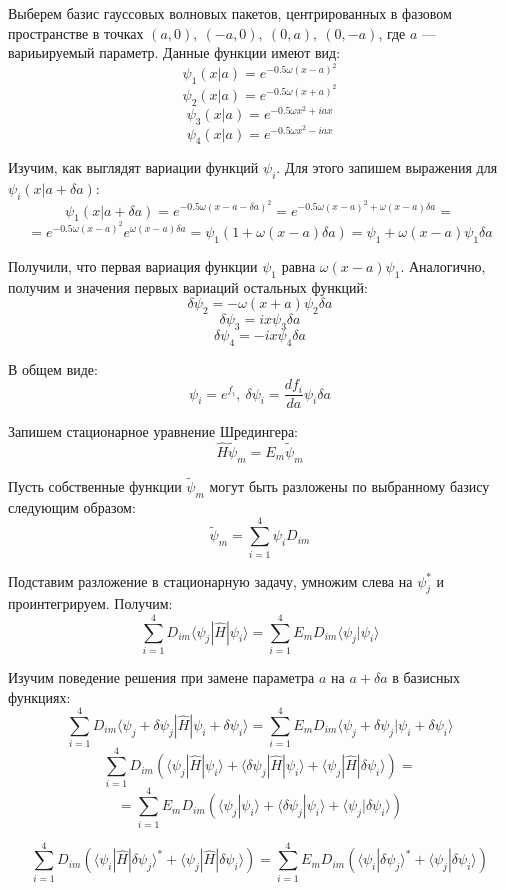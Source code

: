 \documentclass[a4paper,14pt]{extarticle}
\begin{document}
Выберем базис гауссовых волновых пакетов, центрированных в фазовом пространстве в точках $(a,0),\ (-a,0),\ (0,a),\ (0,-a)$, где $a$ --- вариьируемый параметр.
Данные функции имеют вид:
$$\psi_1(x|a) = e^{ -0.5\omega(x - a)^2 }$$
$$\psi_2(x|a) = e^{ -0.5\omega(x + a)^2 }$$
$$\psi_3(x|a) = e^{ -0.5\omega x^2 + iax }$$
$$\psi_4(x|a) = e^{ -0.5\omega x^2 - iax }$$

Изучим, как выглядят вариации функций $\psi_i$. Для этого запишем выражения для $\psi_i(x|a+\delta a)$:
$$\psi_1(x|a+\delta a) = e^{ -0.5\omega(x - a - \delta a)^2 } = e^{ -0.5\omega(x - a)^2 + \omega(x-a)\delta a} = $$
$$ = e^{ -0.5\omega(x - a)^2} e^{\omega(x-a)\delta a} = \psi_1(1 + \omega(x-a)\delta a ) = \psi_1 + \omega(x-a)\psi_1\delta a$$

Получили, что первая вариация функции $\psi_1$ равна $\omega(x-a)\psi_1$. Аналогично, получим и значения первых вариаций остальных функций:
$$\delta\psi_2 = -\omega(x+a)\psi_2\delta a$$
$$\delta\psi_3 = ix\psi_3\delta a$$
$$\delta\psi_4 = -ix\psi_4\delta a$$

В общем виде:
$$\psi_i = e^{f_i},\ \delta\psi_i = \frac{d f_i}{da}\psi_i\delta a$$

Запишем стационарное уравнение Шредингера:
$$\hat{H}\tilde{\psi}_m = E_m\tilde{\psi}_m$$

Пусть собственные функции $\tilde{\psi}_m$ могут быть разложены по выбранному базису следующим образом:
$$ \tilde{\psi}_m = \sum_{i=1}^4 \psi_i D_{im}$$

Подставим разложение в стационарную задачу, умножим слева на $\psi_j^*$ и проинтегрируем. Получим:
$$\sum_{i=1}^4 D_{im} \langle\psi_j|\hat{H}|\psi_i\rangle = \sum_{i=1}^4 E_mD_{im}\langle\psi_j|\psi_i\rangle$$

Изучим поведение решения при замене параметра $a$ на $a + \delta a$ в базисных функциях:
$$\sum_{i=1}^4 D_{im} \langle\psi_j + \delta\psi_j|\hat{H}|\psi_i + \delta\psi_i\rangle = \sum_{i=1}^4 E_mD_{im}\langle\psi_j + \delta\psi_j|\psi_i + \delta\psi_i\rangle$$
$$\sum_{i=1}^4 D_{im} \left( \langle\psi_j|\hat{H}|\psi_i\rangle + \langle\delta\psi_j|\hat{H}|\psi_i\rangle + \langle\psi_j|\hat{H}|\delta\psi_i\rangle  \right) = $$
$$ = \sum_{i=1}^4 E_mD_{im}\left( \langle\psi_j|\psi_i\rangle + \langle\delta\psi_j|\psi_i\rangle + \langle\psi_j|\delta\psi_i\rangle \right)$$

$$\sum_{i=1}^4 D_{im} \left( \langle\psi_i|\hat{H}|\delta\psi_j\rangle^* + \langle\psi_j|\hat{H}|\delta\psi_i\rangle  \right) = %
  \sum_{i=1}^4 E_mD_{im}\left( \langle\psi_i|\delta\psi_j\rangle^* + \langle\psi_j|\delta\psi_i\rangle \right)$$
\end{document}
